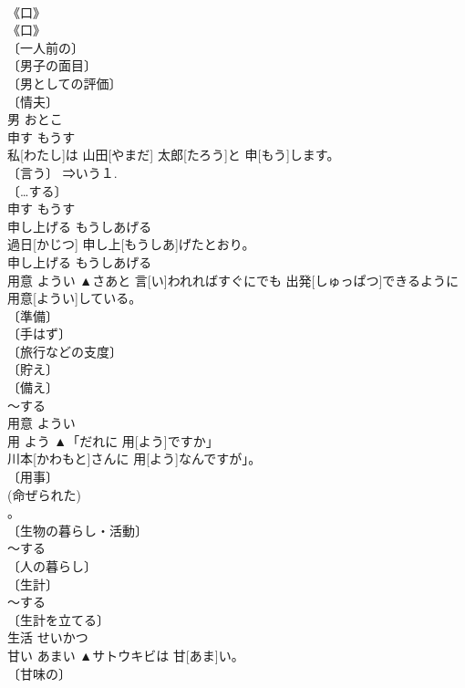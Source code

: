\documentclass[8pt]{extreport}
\begin{document}
\begin{CJK}{UTF8}{min}
\\	《口》 
\\	《口》 
\\	〔一人前の〕 
\\	〔男子の面目〕 
\\	〔男としての評価〕 
\\	〔情夫〕 
\\	男	おとこ	
\\	申す	もうす	
\\	私[わたし]は 山田[やまだ] 太郎[たろう]と 申[もう]します。	
\\	〔言う〕 ⇒いう１. 
\\	〔…する〕 
\\	申す	もうす	
\\	申し上げる	もうしあげる	
\\	過日[かじつ] 申し上[もうしあ]げたとおり。	
\\	申し上げる	もうしあげる	
\\	用意	ようい	▲さあと 言[い]われればすぐにでも 出発[しゅっぱつ]できるように 用意[ようい]している。	
\\	〔準備〕 
\\	〔手はず〕 
\\	〔旅行などの支度〕 
\\	〔貯え〕 
\\	〔備え〕 
\\	～する 
\\	用意	ようい	
\\	用	よう	▲「だれに 用[よう]ですか」
\\	川本[かわもと]さんに 用[よう]なんですが」。	
\\	〔用事〕 
\\	(命ぜられた) 
\\	[⇒ようじ４, ごよう１ 
\\	〔役・働き〕 
\\	〔(名詞について)そのための〕 
\\	〔用便〕	用	よう	
\\	生活	せいかつ	▲アリの 生活[せいかつ]。	
\\	〔生物の暮らし・活動〕 
\\	～する 
\\	〔人の暮らし〕 
\\	〔生計〕 
\\	[⇒くらし] ～する 
\\	〔生計を立てる〕 
\\	生活	せいかつ	
\\	甘い	あまい	▲サトウキビは 甘[あま]い。	
\\	〔甘味の〕 

\end{CJK}
\end{document}
